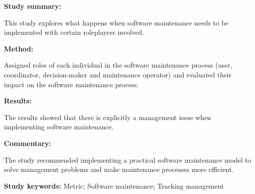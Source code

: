 \begin{tcolorbox}[colback=gray!5!white, colframe=pastelgreen!40!black, title=Metric-based tracking management in software maintenance\cite{Tang2010}]
	\begin{minipage}[t]{0.25\textwidth}
		\textbf{Study summary:}
	\end{minipage}
	\hfill
	\begin{minipage}[t]{0.65\textwidth}
		This study explores what happens when software maintenance needs to be implemented with certain roleplayers involved.
	\end{minipage}

	\vspace{0.75em} 

	\begin{minipage}[t]{0.25\textwidth}
		\textbf{Method:}
	\end{minipage}
	\hfill
	\begin{minipage}[t]{0.65\textwidth}
		Assigned roles of each individual in the software maintenance process (user, coordinator, decision-maker and maintenance operator) and evaluated their impact on the software maintenance process. 
	\end{minipage}

	\vspace{0.75em} 

	\begin{minipage}[t]{0.25\textwidth}
		\textbf{Results:}
	\end{minipage}
	\hfill
	\begin{minipage}[t]{0.65\textwidth}
		The results showed that there is explicitly a management issue when implementing software maintenance. 
	\end{minipage}

	\vspace{0.75em} 

	\begin{minipage}[t]{0.25\textwidth}
		\textbf{Commentary:}
	\end{minipage}
	\hfill
	\begin{minipage}[t]{0.65\textwidth}
		The study recommended implementing a practical software maintenance model to solve management problems and make maintenance processes more efficient.
	\end{minipage}
	\tcblower
	\textbf{Study keywords:} Metric; Software maintenance; Tracking management
\end{tcolorbox}

